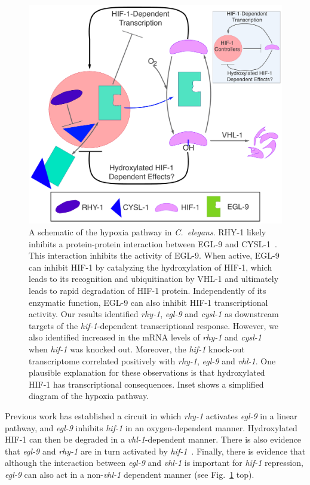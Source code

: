 \documentclass[9pt,twocolumn,twoside]{pnas-new}
\newcommand{\cel}{\emph{C.~elegans}}
\newcommand{\egl}{\emph{egl-9}}
\newcommand{\cysl}{\emph{cysl-1}}
\newcommand{\rhy}{\emph{rhy-1}}
\newcommand{\vhl}{\emph{vhl-1}}
\newcommand{\hif}{\emph{hif-1}}
\newcommand{\eglp}{EGL-9}
\newcommand{\rhyp}{RHY-1}
\newcommand{\vhlp}{VHL-1}
\newcommand{\hifp}{HIF-1}
\begin{document}
\begin{figure}[tbhp]
\centering
\includegraphics[width=\linewidth]{figs/new_model.pdf}
\caption{A schematic of the hypoxia pathway in \cel{}. \rhyp{} likely inhibits a protein-protein interaction between \eglp{} and CYSL-1~\cite{Ma2012}. This interaction inhibits the activity of \eglp{}. When active, \eglp{} can inhibit \hifp{} by catalyzing the hydroxylation of \hifp{}, which leads to its recognition and ubiquitination by \vhlp{} and ultimately leads to rapid degradation of \hifp{} protein. Independently of its enzymatic function, \eglp{} can also inhibit \hifp{} transcriptional activity. Our results identified \rhy{}, \egl{} and \cysl{} as downstream targets of the \hif{}-dependent transcriptional response.
However, we also identified increased in the mRNA levels of \rhy{} and \cysl{} when \hif{} was knocked out.
Moreover, the \hif{} knock-out transcriptome correlated positively with \rhy{}, \egl{} and \vhl{}. One plausible explanation for these observations is that hydroxylated \hifp{} has transcriptional consequences.
Inset shows a simplified diagram of the hypoxia pathway.
}
\label{fig:newmodel}
\end{figure}

Previous work has established a circuit in which \rhy{} activates \egl{} in a linear pathway, and \egl{} inhibits \hif{} in an oxygen-dependent manner. Hydroxylated \hifp{} can then be degraded in a \vhl{}-dependent manner. There is also evidence that \egl{} and \rhy{} are in turn activated by \hif{}~\cite{Bishop2004,Powell-Coffman2010}.
Finally, there is evidence that although the interaction between \egl{} and \vhl{} is important for \hif{} repression, \egl{} can also act in a non-\vhl{} dependent manner (see Fig.~\ref{fig:newmodel} top).
\end{document}
